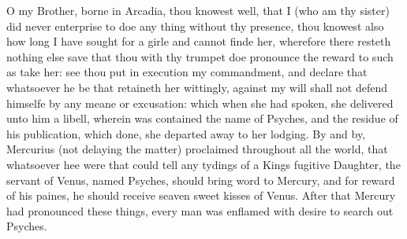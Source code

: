 O my Brother, borne in Arcadia, thou knowest well, that I (who am thy sister)
did never enterprise to doe any thing without thy presence, thou knowest also
how long I have sought for a girle and cannot finde her, wherefore there
resteth nothing else save that thou with thy trumpet doe pronounce the reward
to such as take her: see thou put in execution my commandment, and declare that
whatsoever he be that retaineth her wittingly, against my will shall not defend
himselfe by any meane or excusation: which when she had spoken, she delivered
unto him a libell, wherein was contained the name of Psyches, and the residue
of his publication, which done, she departed away to her lodging. By and by,
Mercurius (not delaying the matter) proclaimed throughout all the world, that
whatsoever hee were that could tell any tydings of a Kings fugitive Daughter,
the servant of Venus, named Psyches, should bring word to Mercury, and for
reward of his paines, he should receive seaven sweet kisses of Venus. After
that Mercury had pronounced these things, every man was enflamed with desire to
search out Psyches.

